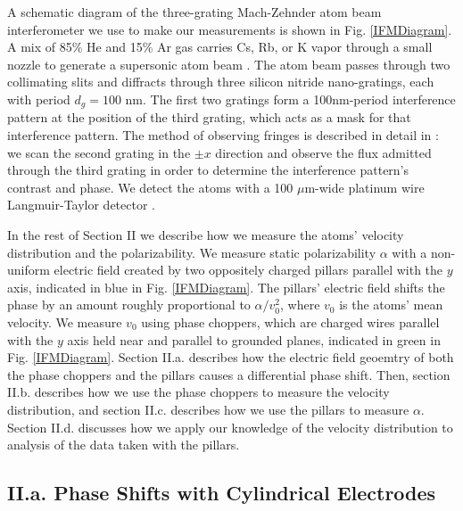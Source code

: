 \documentclass[twocolumn,prl,showpacs,superscriptaddress]{revtex4-1}   %
\newcommand{\figref}[1]{Fig. \ref{#1}}
\begin{document}
A schematic diagram of the three-grating Mach-Zehnder atom beam interferometer we use to make our measurements is shown in \figref{IFMDiagram}. 
A mix of 85\% He and 15\% Ar gas carries Cs, Rb, or K vapor through a small nozzle to generate a supersonic atom beam \cite{Scoles} \cite{Ekstrom1993}. 
The atom beam passes through two collimating slits and diffracts through three silicon nitride nano-gratings, each with period $d_g = 100$ nm.
The first two gratings form a 100nm-period interference pattern at the position of the third grating, which acts as a mask for that interference pattern. 
The method of observing fringes is described in detail in \cite{Kokorowski2001}: we scan the second grating in the $\pm x$ direction and observe the flux admitted through the third grating in order to determine the interference pattern's contrast and phase.
We detect the atoms with a 100 $\mu$m-wide platinum wire Langmuir-Taylor detector \cite{Delhuille2002}.

In the rest of Section II we describe how we measure the atoms' velocity distribution and the polarizability.
We measure static polarizability $\alpha$ with a non-uniform electric field created by two oppositely charged pillars parallel with the $y$ axis, indicated in blue in \figref{IFMDiagram}. The pillars' electric field shifts the phase by an amount roughly proportional to $\alpha/v_0^2$, where $v_0$ is the atoms' mean velocity. We measure $v_0$ using phase choppers, which are charged wires parallel with the $y$ axis held near and parallel to grounded planes, indicated in green in \figref{IFMDiagram}.
Section II.a. describes how the electric field geoemtry of both the phase choppers and the pillars causes a differential phase shift. Then, section II.b. describes how we use the phase choppers to measure the velocity distribution, and section II.c. describes how we use the pillars to measure $\alpha$. Section II.d. discusses how we apply our knowledge of the velocity distribution to analysis of the data taken with the pillars.


\subsection{II.a. Phase Shifts with Cylindrical Electrodes}
\end{document}
